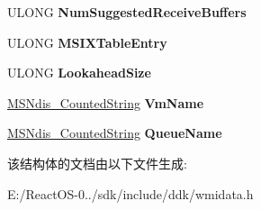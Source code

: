 \begin{DoxyCompactItemize}
U\+L\+O\+NG {\bfseries Num\+Suggested\+Receive\+Buffers}
\item 
\mbox{\label{struct___m_s_ndis___receive_queue_parameters_aeed21443fd999dde1b28ef58ce981c63}} 
U\+L\+O\+NG {\bfseries M\+S\+I\+X\+Table\+Entry}
\item 
\mbox{\label{struct___m_s_ndis___receive_queue_parameters_a88dd38d8339f34b4e952a84638bcd667}} 
U\+L\+O\+NG {\bfseries Lookahead\+Size}
\item 
\mbox{\label{struct___m_s_ndis___receive_queue_parameters_a89d94dbe9c31634163559af5a3ee4131}} 
\hyperlink{struct___m_s_ndis___counted_string}{M\+S\+Ndis\+\_\+\+Counted\+String} {\bfseries Vm\+Name}
\item 
\mbox{\label{struct___m_s_ndis___receive_queue_parameters_a9150072d698b2103c179b74befb534d5}} 
\hyperlink{struct___m_s_ndis___counted_string}{M\+S\+Ndis\+\_\+\+Counted\+String} {\bfseries Queue\+Name}
\end{DoxyCompactItemize}


该结构体的文档由以下文件生成\+:\begin{DoxyCompactItemize}
\item 
E\+:/\+React\+O\+S-\/0../sdk/include/ddk/wmidata.\+h\end{DoxyCompactItemize}
